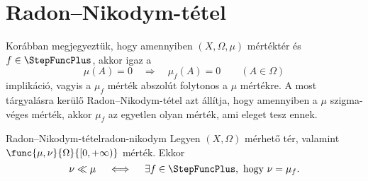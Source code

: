 \documentclass[
]{elteikthesis}[2024/04/26]
\begin{document}
	\section{Radon--Nikodym-tétel}
	
	Korábban megjegyeztük, hogy amennyiben \( (X, \Omega, \mu) \) mértéktér és
	\( f \in \StepFuncPlus \), akkor igaz a
	\[
		\mu(A) = 0
		\quad \Longrightarrow \quad
		\mu_f(A) = 0
		\qquad (A \in \Omega)
	\]
	implikáció, vagyis a \( \mu_f \) mérték abszolút folytonos a \( \mu \) mértékre.
	A most tárgyalásra kerülő Radon--Nikodym-tétel azt állítja, hogy amennyiben a \( \mu \) szigma-véges mérték, akkor \( \mu_f \) az egyetlen olyan mérték, ami eleget tesz ennek.
	
	\newpage
	\begin{theorem}{Radon--Nikodym-tétel}{radon-nikodym}
		Legyen \( (X, \Omega) \) mérhető tér, 
		valamint \( \func{\mu, \nu}{\Omega}{[0, +\infty)} \) mérték. Ekkor
		\[
			\nu \ll \mu
			\quad \iff \quad
			\exists f \in \StepFuncPlus, \text{ hogy } \nu = \mu_f.
		\]
	\end{theorem}
\end{document}
